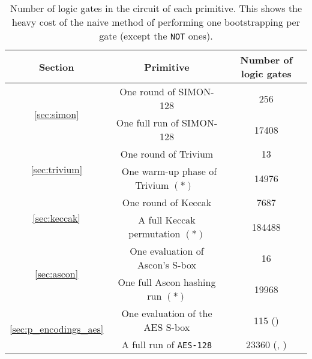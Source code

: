 \begin{table}
    \centering
    \begin{tabular}{|c|c|c|}
        \hline
        \textbf{Section} & \textbf{Primitive} & \textbf{Number of logic gates}  \\
        \hline
        \multirow{2}{*}{\ref{sec:simon}} & One round of SIMON-128 & 256\\
        \cline{2-3}
        & One full run of SIMON-128 & 17408\\
        \hline
        \multirow{2}{*}{\ref{sec:trivium}} & One round of Trivium & 13\\
        \cline{2-3}
        & ~One warm-up phase of Trivium $(*)$~ & 14976\\
        \hline
        \multirow{2}{*}{\ref{sec:keccak}} & One round of Keccak & 7687\\
        \cline{2-3}
        & A full Keccak permutation $(*)$ & 184488\\
        \hline
      \multirow{2}{*}{ \ref{sec:ascon}} & One evaluation of Ascon's S-box & 16\\
      \cline{2-3}
      & One full Ascon hashing run $(*)$ & 19968\\
        \hline
        \multirow{2}{*}{\ref{sec:p_encodings_aes}} & One evaluation of the \gls{AES} S-box & 115 (\cite{boyar})\\
        \cline{2-3}
        & A full run of \texttt{\gls{AES}-128}  & 23360 (\cite{boyar}, \cite{EPRINT:Maximov19})\\
        \hline
    \end{tabular}
    \medskip
    \caption{Number of logic gates in the circuit of each primitive. This shows the heavy cost of the naive method of performing one bootstrapping per gate (except the \texttt{NOT} ones).}
    \label{tab:gates}
\end{table}


